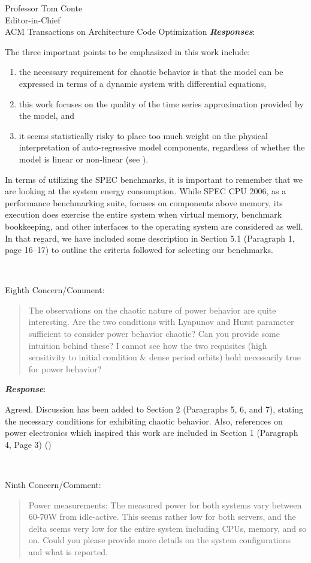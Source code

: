\documentclass[10pt]{letter} %
\newenvironment{rviewcomment}
{~\\%
\begin{bfseries}}
{\end{bfseries}}
\newcommand{\rviewresponse}{\textbf{\textit{Response}}:}
\newcommand{\rviewresponses}{\textbf{\textit{Responses}}:}
\begin{document}
\begin{letter}{Professor Tom Conte \\
Editor-in-Chief \\
ACM Transactions on Architecture Code Optimization }
\rviewresponses

The three important points to be emphasized in this work include:
\begin{enumerate}
\item the necessary requirement for chaotic behavior is that the model
  can be expressed in terms of a dynamic system with differential
  equations,
\item this work focuses on the quality of the time series approximation
  provided by the model, and
\item it seems statistically risky to place too much weight on the
  physical interpretation of auto-regressive model components,
  regardless of whether the model is linear or non-linear (see
  \cite{McCullough2011}).
\end{enumerate}
In terms of utilizing the SPEC benchmarks, it is important to remember
that we are looking at the system energy consumption.  While SPEC CPU
2006, as a performance benchmarking suite, focuses on components above
memory, its execution does exercise the entire system when virtual
memory, benchmark bookkeeping, and other interfaces to the operating
system are considered as well.  In that regard, we have included some
description in Section 5.1 (Paragraph 1, page 16--17)
to outline the criteria followed for selecting our benchmarks.

\begin{rviewcomment}
  Eighth Concern/Comment:
\end{rviewcomment}
\begin{quote}
\begin{itshape}
The observations on the chaotic nature of power behavior are quite
interesting. Are the two conditions with Lyapunov and Hurst parameter
sufficient to consider power behavior chaotic? Can you provide some
intuition behind these? I cannot see how the two requisites (high
sensitivity to initial condition \& dense period orbits) hold necessarily
true for power behavior?
\end{itshape}
\end{quote}

\rviewresponse

Agreed. Discussion has been added to Section 2 (Paragraphs 5, 6, and 7),
stating the necessary conditions for exhibiting chaotic behavior.  Also,
references on power electronics which inspired this work are included in
Section 1 (Paragraph 4, Page 3) (\cite{Hamill1997,Tse2002})

\begin{rviewcomment}
  Ninth Concern/Comment:
\end{rviewcomment}
\begin{quote}
\begin{itshape}
Power measurements: The measured power for both systems vary between
60-70W from idle-active. This seems rather low for both servers, and the
delta seems very low for the entire system including CPUs, memory, and
so on. Could you please provide more details on the system
configurations and what is reported.
\end{itshape}
\end{quote}


\end{letter}
\end{document}
